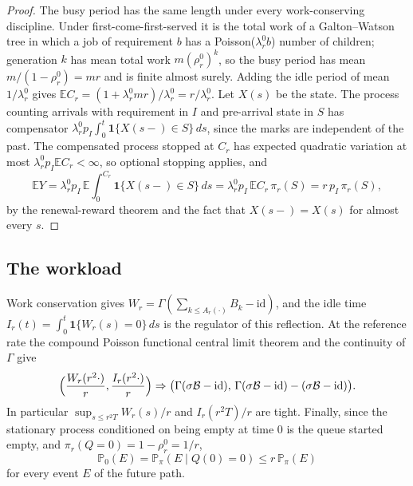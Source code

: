 \documentclass[11pt]{amsart}
\theoremstyle{remark}
\numberwithin{equation}{section}
\newcommand{\E}{\mathbb E}
\newcommand{\Pp}{\mathbb P}
\newcommand{\1}{\mathbf 1}
\begin{document}
\begin{proof}
The busy period has the same length under every work-conserving discipline. Under first-come-first-served it is the total work of a Galton--Watson tree in which a job of requirement $b$ has a Poisson($\lambda^0_rb$) number of children; generation $k$ has mean total work $m(\rho^0_r)^k$, so the busy period has mean $m/(1-\rho_r^0)=mr$ and is finite almost surely. Adding the idle period of mean $1/\lambda^0_r$ gives $\E C_r=(1+\lambda^0_rmr)/\lambda^0_r=r/\lambda^0_r$. Let $X(s)$ be the state. The process counting arrivals with requirement in $I$ and pre-arrival state in $S$ has compensator $\lambda^0_rp_I\int_0^t\1\{X(s-)\in S\}\,ds$, since the marks are independent of the past. The compensated process stopped at $C_r$ has expected quadratic variation at most $\lambda^0_rp_I\E C_r<\infty$, so optional stopping applies, and
\[
\E Y=\lambda^0_rp_I\,\E\int_0^{C_r}\1\{X(s-)\in S\}\,ds=\lambda^0_rp_I\,\E C_r\,\pi_r(S)=r\,p_I\,\pi_r(S),
\]
by the renewal-reward theorem and the fact that $X(s-)=X(s)$ for almost every $s$.
\end{proof}

\subsection{The workload}
Work conservation gives $W_r=\Gamma(\sum_{k\le A_r(\cdot)}B_k-\mathrm{id})$, and the idle time $I_r(t)=\int_0^t\1\{W_r(s)=0\}\,ds$ is the regulator of this reflection. At the reference rate the compound Poisson functional central limit theorem and the continuity of $\Gamma$ \cite{Whi} give
\begin{equation}\label{eq:wfclt}
\Bigl(\frac{W_r(r^2\cdot)}r,\frac{I_r(r^2\cdot)}r\Bigr)\Rightarrow\bigl(\Gamma(\sigma\mathcal B-\mathrm{id}),\,\Gamma(\sigma\mathcal B-\mathrm{id})-(\sigma\mathcal B-\mathrm{id})\bigr).
\end{equation}
In particular $\sup_{s\le r^2T}W_r(s)/r$ and $I_r(r^2T)/r$ are tight. Finally, since the stationary process conditioned on being empty at time $0$ is the queue started empty, and $\pi_r(Q=0)=1-\rho^0_r=1/r$,
\begin{equation}\label{eq:cond}
\Pp_0(E)=\Pp_\pi(E\mid Q(0)=0)\le r\,\Pp_\pi(E)
\end{equation}
for every event $E$ of the future path.
\end{document}
